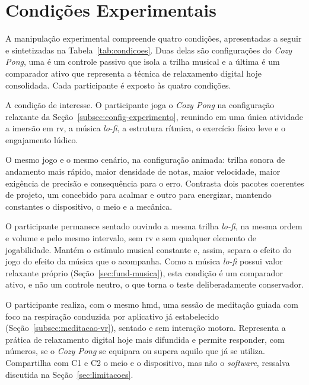 \section{Condições Experimentais}\label{sec:condicoes}

A manipulação experimental compreende quatro condições, apresentadas a seguir e sintetizadas na Tabela~\ref{tab:condicoes}. Duas delas são configurações do \textit{Cozy Pong}, uma é um controle passivo que isola a trilha musical e a última é um comparador ativo que representa a técnica de relaxamento digital hoje consolidada. Cada participante é exposto às quatro condições.

\begin{description}[style=nextline]
    \item[\textbf{C1 --- \textit{Cozy Pong} Relaxante (intervenção).}]
    A condição de interesse. O participante joga o \textit{Cozy Pong} na configuração relaxante da Seção~\ref{subsec:config-experimento}, reunindo em uma única atividade a imersão em \gls{rv}, a música \textit{lo-fi}, a estrutura rítmica, o exercício físico leve e o engajamento lúdico.

    \item[\textbf{C2 --- \textit{Cozy Pong} Animado (controle de projeto).}]
    O mesmo jogo e o mesmo cenário, na configuração animada: trilha sonora de andamento mais rápido, maior densidade de notas, maior velocidade, maior exigência de precisão e consequência para o erro. Contrasta dois pacotes coerentes de projeto, um concebido para acalmar e outro para energizar, mantendo constantes o dispositivo, o meio e a mecânica.

    \item[\textbf{C3 --- Trilha \textit{lo-fi} sentado, sem jogar (controle passivo).}]
    O participante permanece sentado ouvindo a mesma trilha \textit{lo-fi}, na mesma ordem e volume e pelo mesmo intervalo, sem \gls{rv} e sem qualquer elemento de jogabilidade. Mantém o estímulo musical constante e, assim, separa o efeito do jogo do efeito da música que o acompanha. Como a música \textit{lo-fi} possui valor relaxante próprio (Seção~\ref{sec:fund-musica}), esta condição é um comparador ativo, e não um controle neutro, o que torna o teste deliberadamente conservador.

    \item[\textbf{C4 --- Meditação guiada em \gls{rv} (comparador de referência).}]
    O participante realiza, com o mesmo \gls{hmd}, uma sessão de meditação guiada com foco na respiração conduzida por aplicativo já estabelecido (Seção~\ref{subsec:meditacao-vr}), sentado e sem interação motora. Representa a prática de relaxamento digital hoje mais difundida e permite responder, com números, se o \textit{Cozy Pong} se equipara ou supera aquilo que já se utiliza. Compartilha com C1 e C2 o meio e o dispositivo, mas não o \textit{software}, ressalva discutida na Seção~\ref{sec:limitacoes}.
\end{description}

